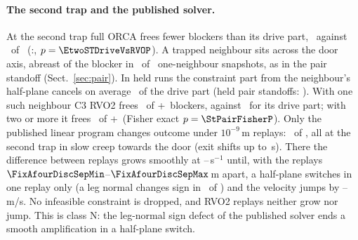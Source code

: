\paragraph{The second trap and the published solver.}
At the second trap full ORCA frees fewer blockers than its drive part, \EtwoSTCThreeRVOFreed\ against \EtwoSTDriveFreed\ of \EtwoSTCThreeRVON\ (\EtwoSTDriveVsRVODiscA:\EtwoSTDriveVsRVODiscB, $p=\EtwoSTDriveVsRVOP$). A trapped neighbour sits across the door axis, abreast of the blocker in \CtwsixAbreastN\ of \CtwsixN\ one-neighbour snapshots, as in the pair standoff (Sect.~\ref{sec:pair}). In held runs the constraint part from the neighbour's half-plane cancels on average \StHeldCancel\ of the drive part (held pair standoffs: \PairTraceCancel). With one such neighbour C3 RVO2 frees \StPairFreed\ of \the\numexpr\StPairFreed+\StPairHeld\relax\ blockers, against \CtwsixDriveFreed\ for its drive part; with two or more it frees \StClusterFreed\ of \the\numexpr\StClusterFreed+\StClusterHeld\relax\ (Fisher exact $p=\StPairFisherP$). Only the published linear program changes outcome under $10^{-9}$\,m replays: \EtwoReplayCThreePubFlips\ of \EtwoReplayN, all at the second trap in slow creep towards the door (exit shifts up to \EtwoReplayCThreePubMaxDt\,s). There the difference between replays grows smoothly at \FixAfourGrowthMin--\FixAfourGrowthMax\,s$^{-1}$ until, with the replays $\FixAfourDiscSepMin$--$\FixAfourDiscSepMax$\,m apart, a half-plane switches in one replay only (a leg normal changes sign in \FixAfourDiscLegFlip\ of \FixAfourDiscN) and the velocity jumps by \FixAfourDiscDvMin--\FixAfourDiscDvMax\,m/s. No infeasible constraint is dropped, and RVO2 replays neither grow nor jump. This is class N: the leg-normal sign defect of the published solver ends a smooth amplification in a half-plane switch.

